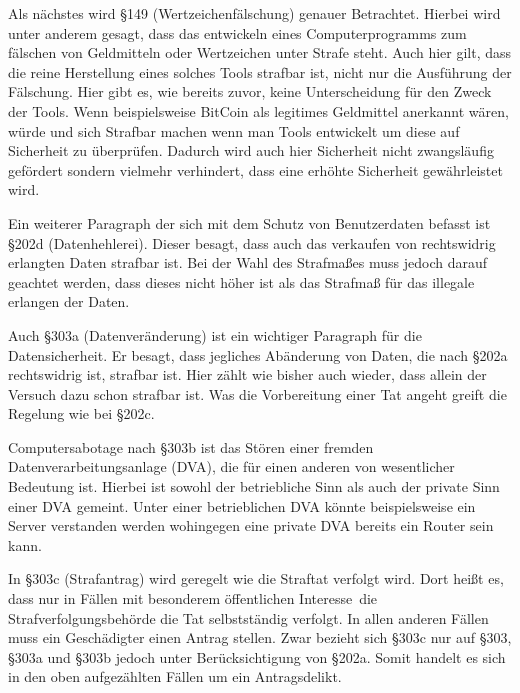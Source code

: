 \documentclass[10pt,a4paper]{article}
\begin{document}
Als nächstes wird §149 (Wertzeichenfälschung) genauer Betrachtet. Hierbei wird unter anderem gesagt, dass das entwickeln eines Computerprogramms zum fälschen von Geldmitteln oder Wertzeichen unter Strafe steht. Auch hier gilt, dass die reine Herstellung eines solches Tools strafbar ist, nicht nur die Ausführung der Fälschung. Hier gibt es, wie bereits zuvor, keine Unterscheidung für den Zweck der Tools. Wenn beispielsweise BitCoin als legitimes Geldmittel anerkannt wären, würde und sich Strafbar machen wenn man Tools entwickelt um diese auf Sicherheit zu überprüfen. Dadurch wird auch hier Sicherheit nicht zwangsläufig gefördert sondern vielmehr verhindert, dass eine erhöhte Sicherheit gewährleistet wird.

Ein weiterer Paragraph der sich mit dem Schutz von Benutzerdaten befasst ist §202d (Datenhehlerei). Dieser besagt, dass auch das verkaufen von rechtswidrig erlangten Daten strafbar ist. Bei der Wahl des Strafmaßes muss jedoch darauf geachtet werden, dass dieses nicht höher ist als das Strafmaß für das illegale erlangen der Daten.

Auch §303a (Datenveränderung) ist ein wichtiger Paragraph für die Datensicherheit. Er besagt, dass jegliches Abänderung von Daten, die nach §202a rechtswidrig ist, strafbar ist. Hier zählt wie bisher auch wieder, dass allein der Versuch dazu schon strafbar ist. Was die Vorbereitung einer Tat angeht greift die Regelung wie bei §202c.

Computersabotage nach §303b ist das Stören einer fremden Datenverarbeitungsanlage (DVA), die für einen anderen von wesentlicher Bedeutung ist. Hierbei ist sowohl der betriebliche Sinn als auch der private Sinn einer DVA gemeint. Unter einer betrieblichen DVA könnte beispielsweise ein Server verstanden werden wohingegen eine private DVA bereits ein Router sein kann.

In §303c (Strafantrag) wird geregelt wie die Straftat verfolgt wird. Dort heißt es, dass nur in Fällen mit \glqq besonderem öffentlichen Interesse\grqq \ die Strafverfolgungsbehörde die Tat selbstständig verfolgt. In allen anderen Fällen muss ein Geschädigter einen Antrag stellen. Zwar bezieht sich §303c nur auf §303, §303a und §303b jedoch unter Berücksichtigung von §202a. Somit handelt es sich in den oben aufgezählten Fällen um ein Antragsdelikt.
\end{document}
